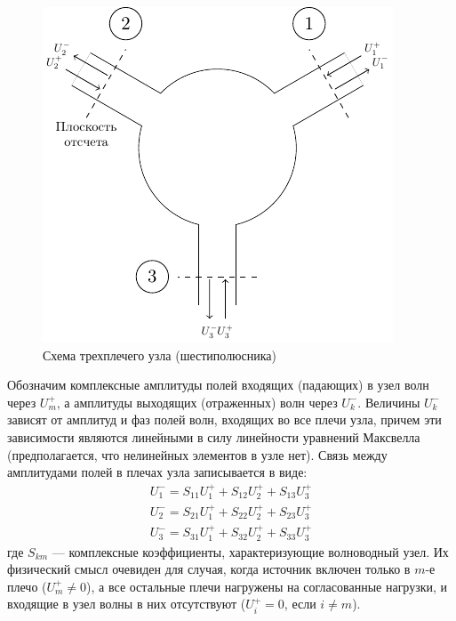 \begin{figure}[h!]
	\centering
	\includegraphics[scale=1.5]{ris/ris1}
	\caption{Схема трехплечего узла (шестиполюсника)}
	\label{fig:figure1}
\end{figure}

Обозначим комплексные амплитуды полей входящих (падающих) в узел волн через $U_m^+$, а амплитуды выходящих (отраженных) волн через $U_k^-$. 
Величины $U_k^-$ зависят от амплитуд и фаз полей волн, входящих во все плечи узла, причем эти зависимости являются линейными в силу линейности уравнений Максвелла (предполагается, что нелинейных элементов в узле нет). 
Связь между амплитудами полей в плечах узла записывается в виде:
\begin{equation}
	\begin{array} { l } { U _ { 1 } ^ { - } = S _ { 11 } U _ { 1 } ^ { + } + S _ { 12 } U _ { 2 } ^ { + } + S _ { 13 } U _ { 3 } ^ { + } } \\ { U _ { 2 } ^ { - } = S _ { 21 } U _ { 1 } ^ { + } + S _ { 22 } U _ { 2 } ^ { + } + S _ { 23 } U _ { 3 } ^ { + } } \\ { U _ { 3 } ^ { - } = S _ { 31 } U _ { 1 } ^ { + } + S _ { 32 } U _ { 2 } ^ { + } + S _ { 33 } U _ { 3 } ^ { + } } \end{array}
\end{equation}
где $S_{km}$ ---  комплексные коэффициенты, характеризующие волноводный узел. 
Их физический смысл очевиден для случая, когда источник включен только в $m$-е плечо ($U_m^+\ne0$), а все остальные плечи нагружены на согласованные нагрузки, и входящие в узел волны в них отсутствуют ($U_i^+=0$, если $i\ne m$). 

